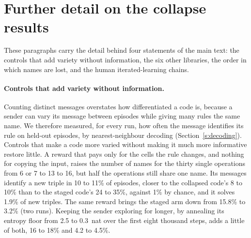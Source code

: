 \documentclass[11pt]{article}
\begin{document}
\begin{table}[h]\centering\small\resizebox{\textwidth}{!}{}
\caption{The same game played by a pretrained model (Qwen2.5-0.5B with low-rank adapters, 5\,000 steps). Runs are
counted at each stage; a run whose 16-bit adapters became non-finite is evaluated at its last snapshot before the
event, and averages use all eight. Accuracy is exact match on the 231
held-out triples no training program computes, beside the same executor's accuracy when every message is replaced
by a constant. Names are the distinct most frequent messages over the 300 held-out triples, purity the frequency of
a rule's most frequent message, and the last column how often the rule is decoded from the message on held-out
episodes (nearest neighbour; chance 0.3\%, permutation null 0.7\%). Mean $\pm$ s.e.m. over runs.}\label{tab:llm}
\end{table}


\section{Further detail on the collapse results}\label{s:detail}
These paragraphs carry the detail behind four statements of the main text: the controls that add variety without
information, the six other libraries, the order in which names are lost, and the human iterated-learning chains.

\paragraph{Controls that add variety without information.} Counting distinct messages overstates how differentiated
a code is, because a sender can vary its message between episodes while giving many rules the same name. We
therefore measured, for every run, how often the message identifies its rule on held-out episodes, by
nearest-neighbour decoding (Section~\ref{s:decoding}). Controls that make a code more
varied without making it much more informative restore little. A reward that pays only for the cells the rule
changes, and nothing for copying the input, raises the number of names for the thirty single operations from 6 or
7 to 13 to 16, but half the operations still share one name. Its messages identify a new triple in 10 to 11\% of
episodes, closer to the collapsed code's 8 to 10\% than to the staged code's 24 to 35\%, against 1\% by chance, and
it solves 1.9\% of new triples. The same reward brings the staged arm down from 15.8\% to 3.2\% (two runs).
Keeping the sender exploring for longer, by annealing its entropy floor from 2.5 to 0.3~nat over the first eight
thousand steps, adds a little of both, 16 to 18\% and 4.2 to 4.5\%.
\end{document}
